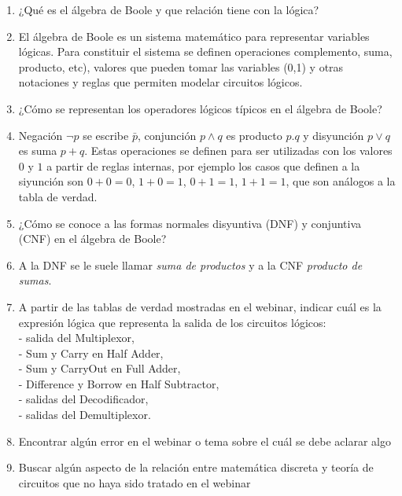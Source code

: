 \documentclass[a4paper]{article}
\newcommand{\Item}{\item[\stepcounter{enumii}$\blacktriangleright$\textbf{(\alph{enumii})}]} %
\newcommand{\answer}{\item[**]}
\begin{document}
\begin{enumerate}[resume]
\begin{enumerate} [label=(\alph*)]
		\Item ¿Qué es el álgebra de Boole y que relación tiene con la lógica?
		\answer El álgebra de Boole es un sistema matemático para representar variables lógicas. Para constituir el sistema se definen operaciones complemento, suma, producto, etc), valores que pueden tomar las variables (0,1) y otras notaciones y reglas que permiten modelar circuitos lógicos.
		
		\Item ¿Cómo se representan los operadores lógicos típicos en el álgebra de Boole? 
		\answer Negación $\neg p$ se escribe $\bar{p}$, conjunción $p\land q$ es producto $p.q$ y disyunción $p \lor q$ es suma $p+q$. Estas operaciones se definen para ser utilizadas con los valores $0$ y $1$ a partir de reglas internas, por ejemplo los casos que definen a la siyunción son $0+0=0$, $1+0=1$, $0+1=1$, $1+1=1$, que son análogos a la tabla de verdad.

		\item ¿Cómo se conoce a las formas normales disyuntiva (DNF) y conjuntiva (CNF) en el álgebra de Boole? 
		\answer A la DNF se le suele llamar \textit{suma de productos} y a la CNF \textit{producto de sumas}.

		\item A partir de las tablas de verdad mostradas en el webinar, indicar cuál es la expresión lógica que representa la salida de los circuitos lógicos: \\ - salida del Multiplexor,\\ - Sum y Carry en Half Adder,\\ - Sum y CarryOut en Full Adder,\\ - Difference y Borrow en Half Subtractor,\\ - salidas del Decodificador,\\ - salidas del Demultiplexor. 

		\item Encontrar algún error en el webinar o tema sobre el cuál se debe aclarar algo 

		\item Buscar algún aspecto de la relación entre matemática discreta y teoría de circuitos que no haya sido tratado en el webinar

	\end{enumerate}
	\fi

	

\end{enumerate}
\end{document}
